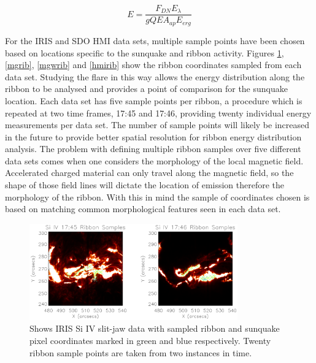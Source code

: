 \begin{equation}\label{hmiradiometriccal}
E = \frac{F_{DN} E_{\lambda}}{g QE A_{ap} E_{erg}}
\end{equation}


For the IRIS and SDO HMI data sets, multiple sample points have been chosen based on locations specific to the sunquake and ribbon activity. Figures \ref{sirib}, \ref{mgrib}, \ref{mgwrib} and \ref{hmirib} show the ribbon coordinates sampled from each data set. Studying the flare in this way allows the energy distribution along the ribbon to be analysed and provides a point of comparison for the sunquake location. Each data set has five sample points per ribbon, a procedure which is repeated at two time frames, 17:45 and 17:46, providing twenty individual energy measurements per data set. The number of sample points will likely be increased in the future to provide better spatial resolution for ribbon energy distribution analysis. The problem with defining multiple ribbon samples over five different data sets comes when one considers the morphology of the local magnetic field. Accelerated charged material can only travel along the magnetic field, so the shape of those field lines will dictate the location of emission therefore the morphology of the ribbon. With this in mind the sample of coordinates chosen is based on matching common morphological features seen in each data set.

\begin{figure}[H]
  \begin{center}
  \includegraphics[width=0.8\textwidth]{29-Mar-14-SI-Ribbon-Coord-oplot}
  \end{center}
  \caption{Shows IRIS Si IV slit-jaw data with sampled ribbon and sunquake pixel coordinates marked in green and blue respectively. Twenty ribbon sample points are taken from two instances in time.}\label{sirib}
\end{figure}

